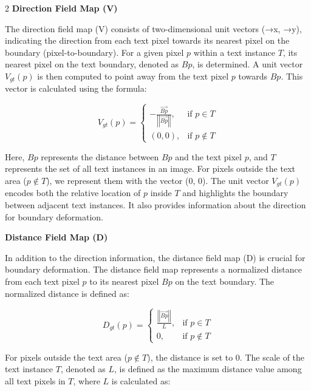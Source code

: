 \documentclass[sn-mathphys,Numbered]{sn-jnl}%
\begin{document}
\begin{multicols}{2}
\textbf{Direction Field Map (V)}

The direction field map (V) consists of two-dimensional unit vectors (→x, →y), indicating the direction from each text pixel towards its nearest pixel on the boundary (pixel-to-boundary). For a given pixel \( p \) within a text instance \( T \), its nearest pixel on the text boundary, denoted as \( Bp \), is determined. A unit vector \( V_{gt}(p) \) is then computed to point away from the text pixel \( p \) towards \( Bp \). This vector is calculated using the formula:

\begin{equation}
    \label{eqn:Text and non-text separation Method}
 V_{gt}(p) =
\begin{cases}
-\frac{\overrightarrow{Bp}}{\left|\left|\overrightarrow{Bp}\right|\right|}, & \text{if } p \in T \\
(0, 0), & \text{if } p \notin T
\end{cases}
\end{equation}

Here, \( Bp \) represents the distance between \( Bp \) and the text pixel \( p \), and \( T \) represents the set of all text instances in an image. For pixels outside the text area (\( p \notin T \)), we represent them with the vector (0, 0). The unit vector \( V_{gt}(p) \) encodes both the relative location of \( p \) inside \( T \) and highlights the boundary between adjacent text instances. It also provides information about the direction for boundary deformation.

\textbf{Distance Field Map (D)}

In addition to the direction information, the distance field map (D) is crucial for boundary deformation. The distance field map represents a normalized distance from each text pixel \( p \) to its nearest pixel \( Bp \) on the text boundary. The normalized distance is defined as:

\begin{equation}
D_{gt}(p) = 
\begin{cases}
\frac{\left|\left|\overrightarrow{Bp}\right|\right|}{L}, & \text{if } p \in T \\
0, & \text{if } p \notin T
\end{cases}
\end{equation}

For pixels outside the text area (\( p \notin T \)), the distance is set to 0. The scale of the text instance \( T \), denoted as \( L \), is defined as the maximum distance value among all text pixels in \( T \), where \( L \) is calculated as:


\end{multicols}
\end{document}
